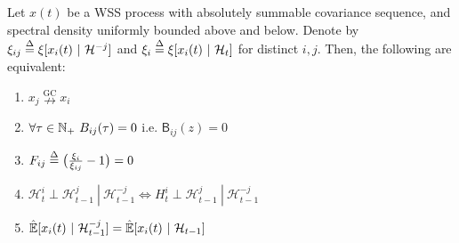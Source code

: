 \documentclass[12pt]{article}
\def\ngc{\overset{\text{GC}}{\nrightarrow}}  %
\def\B{\mathsf{B}}  %
\def\H{\mathcal{H}}  %
\newcommand{\linE}[2]{\hat{\E}[#1\ |\ #2]}  %
\newcommand{\linEerr}[2]{\xi[#1\ |\ #2]}  %
\begin{document}
\begin{theorem}
  \label{thm:granger_causality_equivalences}
  Let $x(t)$ be a WSS process with absolutely summable covariance
  sequence, and spectral density uniformly bounded above and below.
  Denote by $\xi_{ij} \defeq \linEerr{x_i(t)}{\H^{-j}}$ and
  $\xi_i \defeq \linEerr{x_i(t)}{\H_t}$ for distinct $i, j$.  Then,
  the following are equivalent:

  \begin{enumerate}
    \item{$x_j \ngc x_i$}
    \item{$\forall \tau \in \N_+\ B_{ij}(\tau) = 0$ i.e. $\B_{ij}(z) = 0$}
    \item{$F_{ij} \overset{\Delta}{=} \big(\frac{\xi_i}{\xi_{ij}} - 1\big) = 0$}
    \item{$\H_t^{i} \perp \H_{t - 1}^{j}\ |\ \H_{t - 1}^{-j} \iff H_t^{i} \perp \H_{t - 1}^{j}\ |\ \H_{t - 1}^{-j}$}
    \item{$\linE{x_i(t)}{\H_{t - 1}^{-j}} = \linE{x_i(t)}{\H_{t - 1}}$}
  \end{enumerate}
\end{theorem}
\end{document}
